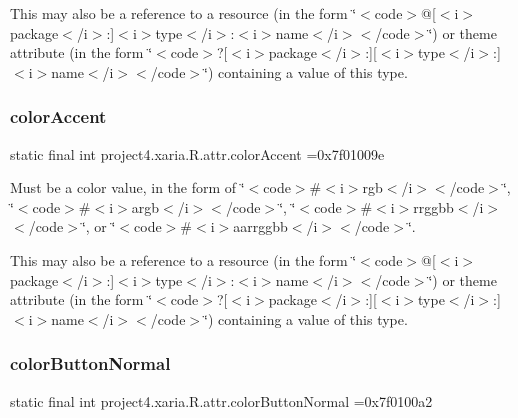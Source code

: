 This may also be a reference to a resource (in the form \char`\"{}$<$code$>$@\mbox{[}$<$i$>$package$<$/i$>$\+:\mbox{]}$<$i$>$type$<$/i$>$\+:$<$i$>$name$<$/i$>$$<$/code$>$\char`\"{}) or theme attribute (in the form \char`\"{}$<$code$>$?\mbox{[}$<$i$>$package$<$/i$>$\+:\mbox{]}\mbox{[}$<$i$>$type$<$/i$>$\+:\mbox{]}$<$i$>$name$<$/i$>$$<$/code$>$\char`\"{}) containing a value of this type. \mbox{\label{classproject4_1_1xaria_1_1R_1_1attr_a17c031145aa9f5722f6e81cb2930618f}} 
\subsubsection{\texorpdfstring{color\+Accent}{colorAccent}}
{\footnotesize\ttfamily static final int project4.\+xaria.\+R.\+attr.\+color\+Accent =0x7f01009e\hspace{0.3cm}{\ttfamily [static]}}

Must be a color value, in the form of \char`\"{}$<$code$>$\#$<$i$>$rgb$<$/i$>$$<$/code$>$\char`\"{}, \char`\"{}$<$code$>$\#$<$i$>$argb$<$/i$>$$<$/code$>$\char`\"{}, \char`\"{}$<$code$>$\#$<$i$>$rrggbb$<$/i$>$$<$/code$>$\char`\"{}, or \char`\"{}$<$code$>$\#$<$i$>$aarrggbb$<$/i$>$$<$/code$>$\char`\"{}. 

This may also be a reference to a resource (in the form \char`\"{}$<$code$>$@\mbox{[}$<$i$>$package$<$/i$>$\+:\mbox{]}$<$i$>$type$<$/i$>$\+:$<$i$>$name$<$/i$>$$<$/code$>$\char`\"{}) or theme attribute (in the form \char`\"{}$<$code$>$?\mbox{[}$<$i$>$package$<$/i$>$\+:\mbox{]}\mbox{[}$<$i$>$type$<$/i$>$\+:\mbox{]}$<$i$>$name$<$/i$>$$<$/code$>$\char`\"{}) containing a value of this type. \mbox{\label{classproject4_1_1xaria_1_1R_1_1attr_aa53e582211b27337c14ac98d70a77327}} 
\subsubsection{\texorpdfstring{color\+Button\+Normal}{colorButtonNormal}}
{\footnotesize\ttfamily static final int project4.\+xaria.\+R.\+attr.\+color\+Button\+Normal =0x7f0100a2\hspace{0.3cm}{\ttfamily [static]}}


